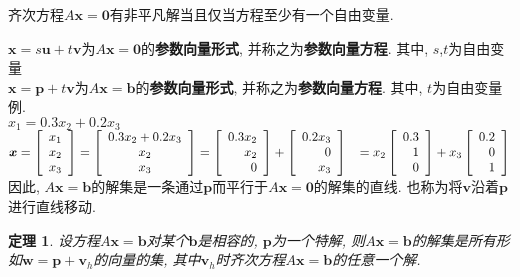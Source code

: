 \documentclass[UTF8,fontset=ubuntu]{ctexart}
\theoremstyle{plain}
\newtheorem{theorem}{定理}
\theoremstyle{nonumberplain}
\theoremstyle{empty}
\begin{document}
\begin{law}
齐次方程$A\bm{x}=\bm{0}$有非平凡解当且仅当方程至少有一个自由变量.
\end{law}\vspace{2ex}

$\bm{x}=s\bm{u}+t\bm{v}$为$A\bm{x}=\bm{0}$的\textbf{参数向量形式}, 并称之为\textbf{参数向量方程}. 其中, $s$,$t$为自由变量\\
$\bm{x}=\bm{p}+t\bm{v}$为$A\bm{x}=\bm{b}$的\textbf{参数向量形式}, 并称之为\textbf{参数向量方程}. 其中, $t$为自由变量\\
例.\\
$x_1=0.3x_2+0.2x_3$\\[1ex]
$\bm{x}=
\left[\begin{array}{l}
x_1\\
x_2\\
x_3
\end{array}\right]=
\left[\begin{array}{c}
0.3x_2+0.2x_3\\
x_2\\
x_3
\end{array}\right]=
\left[\begin{array}{r}
0.3x_2\\
x_2\\
0
\end{array}\right]+\left[\begin{array}{r}
0.2x_3\\
0\\
x_3
\end{array}\right]\\
\phantom{\bm{x}}=x_2\left[\begin{array}{r}
0.3\\
1\\
0
\end{array}\right]+x_3\left[\begin{array}{r}
0.2\\
0\\
1
\end{array}\right]
$\\[1ex]
因此, $A\bm{x}=\bm{b}$的解集是一条通过$\bm{p}$而平行于$A\bm{x}=\bm{0}$的解集的直线. 也称为将$\bm{v}$沿着$\bm{p}$进行直线移动.\\[2ex]

\begin{theorem}
设方程$A\bm{x}=\bm{b}$对某个$\bm{b}$是相容的, $\bm{p}$为一个特解, 则$A\bm{x}=\bm{b}$的解集是所有形如$\bm{w}=\bm{p}+\bm{v}_h$的向量的集, 其中$\bm{v}_h$时齐次方程$A\bm{x}=\bm{b}$的任意一个解.
\end{theorem}\vspace{3ex}
\end{document}
